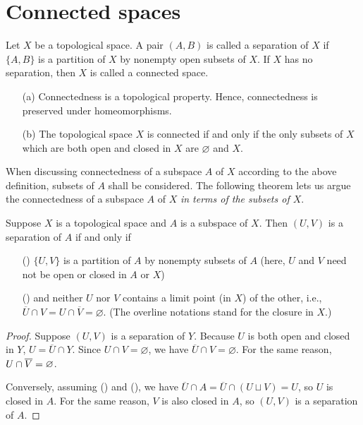 \section{Connected spaces}

\begin{defi}
    Let $X$ be a topological space.
    A pair $(A, B)$ is called a separation of $X$ if $\{A, B\}$ is a partition of $X$ by nonempty open subsets of $X$.
    If $X$ has no separation, then $X$ is called a connected space.
\end{defi}
\begin{rmk}
    \begin{enumerate}
        \item[(a)]
        {
            Connectedness is a topological property.
            Hence, connectedness is preserved under homeomorphisms.
        }
        \item[(b)]
        {
            The topological space $X$ is connected if and only if the only subsets of $X$ which are both open and closed in $X$ are $\varnothing$ and $X$.
        }
    \end{enumerate}
\end{rmk}

When discussing connectedness of a subspace $A$ of $X$ according to the above definition, subsets of $A$ shall be considered.
The following theorem lets us argue the connectedness of a subspace $A$ of $X$ \textit{in terms of the subsets of $X$}.
\begin{thm}
    Suppose $X$ is a topological space and $A$ is a subspace of $X$.
    Then $(U, V)$ is a separation of $A$ if and only if
    \begin{enumerate}
        \item[(\romannumeral 1)]
        {
            $\{U, V\}$ is a partition of $A$ by nonempty subsets of $A$ (here, $U$ and $V$ need not be open or closed in $A$ or $X$)
        }
        \item[(\romannumeral 2)]
        {
            and neither $U$ nor $V$ contains a limit point (in $X$) of the other, i.e., $\overline{U}\cap V=U\cap\overline{V}=\varnothing$. (The overline notations stand for the closure in $X$.)
        }
    \end{enumerate}
\end{thm}
\begin{proof}
    Suppose $(U, V)$ is a separation of $Y$.
    Because $U$ is both open and closed in $Y$, $U=\overline{U}\cap Y$.
    Since $U\cap V=\varnothing$, we have $\overline{U}\cap V=\varnothing$.
    For the same reason, $U\cap\overline{V}=\varnothing$.

    Conversely, assuming () and (), we have $\overline{U}\cap A=\overline{U}\cap(U\sqcup V)=U$, so $U$ is closed in $A$.
    For the same reason, $V$ is also closed in $A$, so $(U, V)$ is a separation of $A$.
\end{proof}

